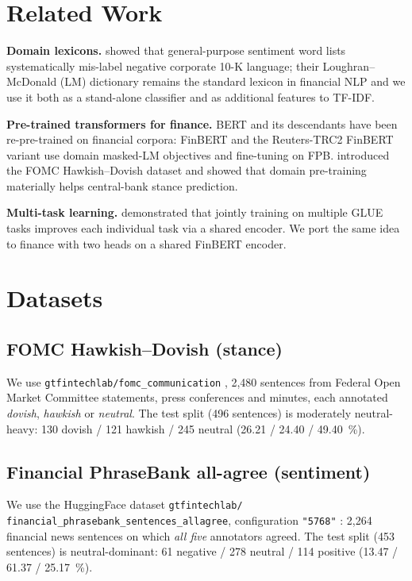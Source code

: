 \documentclass[conference, 10pt, twocolumn]{IEEEtran}
\begin{document}
\section{Related Work}
\label{sec:related}
\textbf{Domain lexicons.} \citet{loughran2011liability} showed that
general-purpose sentiment word lists systematically mis-label negative
corporate 10-K language; their Loughran--McDonald (LM) dictionary remains
the standard lexicon in financial NLP and we use it both as a stand-alone
classifier and as additional features to TF-IDF.

\textbf{Pre-trained transformers for finance.} BERT \cite{devlin2019bert}
and its descendants have been re-pre-trained on financial corpora: FinBERT
\cite{araci2019finbert} and the Reuters-TRC2 FinBERT variant
\cite{yang2020finbert} use domain masked-LM objectives and fine-tuning on
FPB. \citet{shah2023trillion} introduced the FOMC Hawkish--Dovish dataset
and showed that domain pre-training materially helps central-bank stance
prediction.

\textbf{Multi-task learning.} \citet{liu2019mt-dnn} demonstrated that
jointly training on multiple GLUE tasks improves each individual task via a
shared encoder. We port the same idea to finance with two heads on a
shared FinBERT encoder.

\section{Datasets}
\label{sec:data}

\subsection{FOMC Hawkish--Dovish (stance)}
\label{sec:data-fomc}
We use \texttt{gtfintechlab/fomc\_communication} \cite{shah2023trillion},
2{,}480 sentences from Federal Open Market Committee statements, press
conferences and minutes, each annotated \emph{dovish}, \emph{hawkish} or
\emph{neutral}. The test split (496 sentences) is moderately
neutral-heavy: 130 dovish / 121 hawkish / 245 neutral
(26.21 / 24.40 / 49.40~\%).

\subsection{Financial PhraseBank all-agree (sentiment)}
\label{sec:data-fpb}
We use the HuggingFace dataset \texttt{gtfintechlab/}\allowbreak
\texttt{financial\_phrasebank\_\allowbreak sentences\_allagree}, configuration
\texttt{"5768"} \cite{malo2014good}: 2{,}264 financial news
sentences on which \emph{all five} annotators agreed. The test split (453
sentences) is neutral-dominant: 61 negative / 278 neutral / 114 positive
(13.47 / 61.37 / 25.17~\%).
\end{document}

